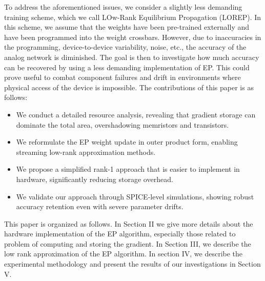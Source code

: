 To address the aforementioned issues, we consider a slightly less demanding
training scheme, which we call LOw-Rank Equilibrium Propagation (LOREP). In
this scheme, we assume that the weights have been pre-trained externally and
have been programmed into the weight crossbars. However, due to inaccuracies in
the programming, device-to-device variability, noise, etc., the accuracy of the
analog network is diminished. The goal is then to investigate how much accuracy
can be recovered by using a less demanding implementation of EP. This could
prove useful to combat component failures and drift in environments where
physical access of the device is impossible. The contributions of this paper is
as follows:

\begin{itemize}

    \item We conduct a detailed resource analysis, revealing that gradient
        storage can dominate the total area, overshadowing memristors and
        transistors.

    \item We reformulate the EP weight update in outer product form, enabling
        streaming low-rank approximation methods.

    \item We propose a simplified rank-1 approach that is easier to implement
        in hardware, significantly reducing storage overhead.

    \item We validate our approach through SPICE-level simulations, showing
        robust accuracy retention even with severe parameter drifts.

\end{itemize}

This paper is organized as follows. In Section II we give more details about
the hardware implementation of the EP algorithm, especially those related to
problem of computing and storing the gradient. In Section III, we describe the
low rank approximation of the EP algorithm. In section IV, we describe the
experimental methodology and present the results of our investigations in
Section V.
